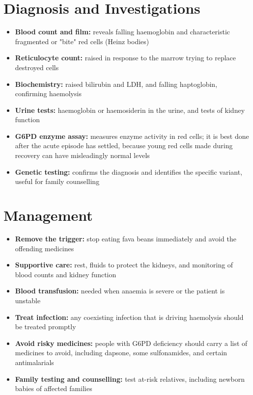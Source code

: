 \section*{Diagnosis and Investigations}
\begin{itemize}
    \item \textbf{Blood count and film:} reveals falling haemoglobin and characteristic fragmented or "bite" red cells (Heinz bodies)
    \item \textbf{Reticulocyte count:} raised in response to the marrow trying to replace destroyed cells
    \item \textbf{Biochemistry:} raised bilirubin and LDH, and falling haptoglobin, confirming haemolysis
    \item \textbf{Urine tests:} haemoglobin or haemosiderin in the urine, and tests of kidney function
    \item \textbf{G6PD enzyme assay:} measures enzyme activity in red cells; it is best done after the acute episode has settled, because young red cells made during recovery can have misleadingly normal levels
    \item \textbf{Genetic testing:} confirms the diagnosis and identifies the specific variant, useful for family counselling
\end{itemize}

\section*{Management}
\begin{itemize}
    \item \textbf{Remove the trigger:} stop eating fava beans immediately and avoid the offending medicines
    \item \textbf{Supportive care:} rest, fluids to protect the kidneys, and monitoring of blood counts and kidney function
    \item \textbf{Blood transfusion:} needed when anaemia is severe or the patient is unstable
    \item \textbf{Treat infection:} any coexisting infection that is driving haemolysis should be treated promptly
    \item \textbf{Avoid risky medicines:} people with G6PD deficiency should carry a list of medicines to avoid, including dapsone, some sulfonamides, and certain antimalarials
    \item \textbf{Family testing and counselling:} test at-risk relatives, including newborn babies of affected families
\end{itemize}


